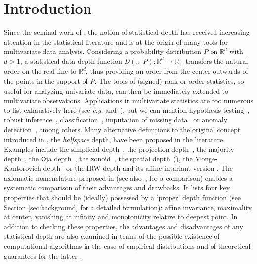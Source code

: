 \documentclass{article}
\numberwithin{equation}{section}
\begin{document}
\section{Introduction}
%
Since the seminal work of \cite{Tukey75}, the notion of
statistical depth has received increasing attention in the
statistical literature and is at the origin of many tools for
multivariate data analysis. Considering a probability distribution
$P$ on $\mathbb{R}^d$ with $d>1$, a statistical data depth function
$D(.;\; P):\mathbb{R}^d\rightarrow \mathbb{R}_+$ transfers the
natural order on the real line to $\mathbb{R}^d$, thus providing an
order from the center outwards of the points in the support of $P$.
The tools of (signed) rank or order statistics, so useful for
analyzing univariate data, can then be immediately extended to
multivariate observations. Applications in multivariate statistics
are too numerous to list exhaustively here (see \textit{e.g.}
\cite{Mosler13} and~\cite{mosler2022choosing}), but we can mention
hypothesis testing~\cite{DyckerhoffLP15}, robust
inference~\cite{LiuPS99},
classification~\cite{LiCAL12,MozharovskyiML15}, imputation of missing data~\cite{MozharovskyiJH20} or anomaly
detection~\cite{MozharovskyiV25,SatermanAMHSGC23,VallaMFAB25},
among others. Many alternative definitions to the original concept
introduced in \cite{Tukey75}, the \textit{halfspace} depth, have been
proposed in the literature. Examples include the simplicial
depth~\cite{Liu}, the projection depth~\cite{Liu92}, the majority
depth~\cite{LiuSingh}, the Oja depth~\cite{OJA1983}, the
zonoid~\cite{koshevoy1997}, the spatial depth~(\cite{Chaudhuri,
Vardi1423}), the Monge-Kantorovich depth~\cite{chernozhukov2017} or
the IRW depth \cite{NagyGijbels2016} and its affine invariant version
\cite{10.1214/23-EJS2189}. The axiomatic nomenclature proposed in
\cite{ZuoS00a} (see also~\cite{mosler2022choosing}, for a comparison)
enables a systematic comparison of their advantages
and drawbacks. It lists four key properties that should be (ideally)
possessed by a `proper' depth function (see Section
\ref{sec:background} for a detailed formulation): affine
invariance, maximality at center, vanishing at infinity and
monotonicity relative to deepest point.  In addition to checking
these properties, the advantages and disadvantages of any statistical
depth are also examined in terms of the possible existence of
computational algorithms in the case of empirical distributions
\cite{dyckerhoff2020approximate} and of theoretical guarantees for the latter \cite{nagyuniformrates}.
\end{document}

